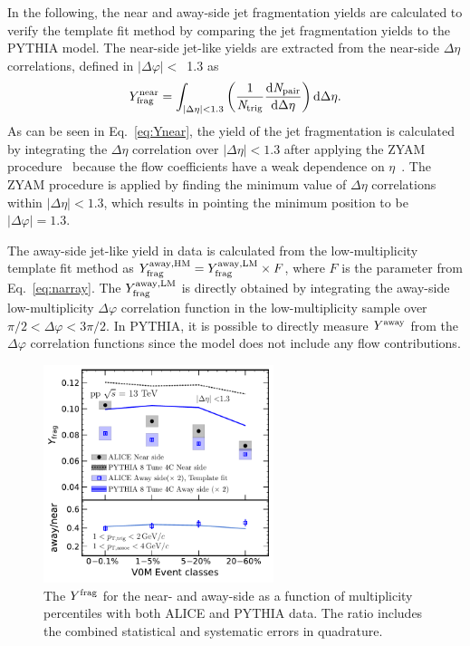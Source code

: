 In the following, the near and away-side jet fragmentation yields are calculated to verify the template fit method by comparing the jet fragmentation yields to the PYTHIA model.
The near-side jet-like yields are extracted from the near-side $\Delta\eta$ correlations, defined in $|\Delta\varphi|<$~1.3 as
\begin{eqnarray}
Y^\mathrm{near}_{\rm{frag}} = \int_{|\Delta \eta|<1.3} \left( \frac{1}{\it{N}_{\rm{trig}}} \frac{ \rm{d}\it{}N_{\rm{pair}} }{ \rm{d}\Delta\eta } \right) \rm{d} \Delta\eta.
\label{eq:Ynear}
\end{eqnarray}
As can be seen in Eq.~\ref{eq:Ynear}, the yield of the jet fragmentation is calculated by integrating the $\Delta\eta$ correlation over $|\Delta\eta|<1.3$ after applying the ZYAM procedure~\cite{Ajitanand:2005jj} because the flow coefficients have a weak dependence on $\eta$~\cite{ATLAS:2011ah,PHENIX:2018hho,ALICE:2016tlx}. The ZYAM procedure is applied by finding the minimum value of $\Delta\eta$ correlations within $|\Delta\eta|<1.3$, which results in pointing the minimum position to be $|\Delta\varphi|=1.3$.

The away-side jet-like yield in data is calculated from the low-multiplicity template fit method as $Y^{\rm{away, HM}}_{\mathrm{frag}} = Y^{\rm{away, LM}}_{\mathrm{frag}} \times F$, where $F$ is the parameter from Eq.~\ref{eq:narray}. The $Y^{\rm{away, LM}}_{\mathrm{frag}}$ is directly obtained by integrating the away-side low-multiplicity $\Delta\varphi$ correlation function in the low-multiplicity sample over $\pi/2 < \Delta\varphi < 3\pi/2$.
In PYTHIA, it is possible to directly measure  $Y^{\rm{away}}$ from the $\Delta\varphi$ correlation functions since the model does not include any flow contributions.

\begin{figure}[h!]
	\centering
	\hspace{-3em}\includegraphics[width=0.6\textwidth]{figures/Fig5_Plot_v2Mult.pdf} 
	\caption{The $Y^{\rm{frag}}$ for the near- and away-side as a function of multiplicity percentiles with both ALICE and PYTHIA data. The ratio includes the combined statistical and systematic errors in quadrature.}
	\label{fig:Ymult}
\end{figure}

